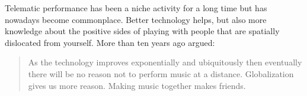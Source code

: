 Telematic performance has been a niche activity for a long time but has nowadays become commonplace. Better technology helps, but also more knowledge about the positive sides of playing with people that are spatially dislocated from yourself. More than ten years ago \citep[p.2]{oliveros_telematic_2009} argued:

\begin{quotation}
As the technology improves exponentially and ubiquitously then eventually there will be no reason not to perform music at a distance. Globalization gives us more reason. Making music together makes friends.
\end{quotation}



